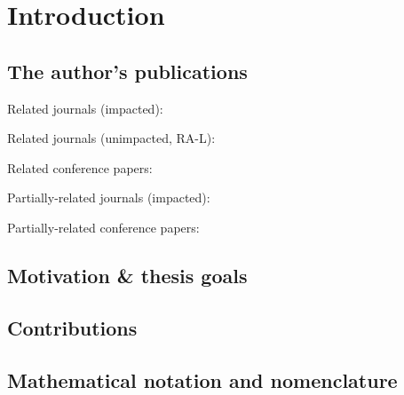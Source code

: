 \documentclass[a4paper,11pt,titlepage,twoside]{book}
\newcommand{\chapternoclear}[1]{
  \begingroup
  \let\cleardoublepage\clearpage
  \chapter{#1}
  \endgroup
}
\begin{document}


\pagestyle{fancy}

\tableofcontents


\cleardoublepage


\chapternoclear{Introduction}


\section{The author's publications}


Related journals (impacted):
\cite{baca2018rospix}
\cite{baca2019autonomous}
\cite{spurny2019cooperative}
\cite{saska2017system}
\cite{giernacky2019realtime}
\cite{chudoba2016exploration}
\cite{saska2020formation}

Related journals (unimpacted, RA-L):
\cite{loianno2018localization}
\cite{petrlik2020robust}
\cite{stibinger2020localization}

Related conference papers:
\cite{baca2019timepix}
\cite{baca2018model}
\cite{baca2016embedded}
\cite{baca2017autonomous}
\cite{saska2017documentation}
\cite{spurny2016complex}
\cite{faigl2017onsolution}
\cite{saska2016formations}
\cite{roucek2019darpa}

Partially-related journals (impacted):
\cite{baca2016miniaturized}
\cite{baca2018vzlusat}
\cite{daniel2019inorbit}
\cite{urban2017vzlusat}

Partially-related conference papers:
\cite{daniel2016terrestrial}
\cite{daniel2017xray}


\section{Motivation \& thesis goals}

\section{Contributions}

\section{Mathematical notation and nomenclature}
\end{document}
